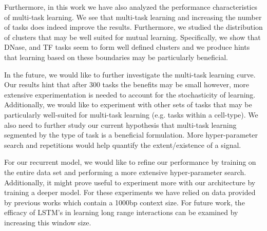 \documentclass{article}
\begin{document}
\par
Furthermore, in this work we have also analyzed the performance characteristics of multi-task learning. We see that multi-task learning and increasing the number of tasks does indeed improve the results.  Furthermore, we studied the distribution of clusters that may be well suited for mutual learning. Specifically, we show that DNase, and TF tasks seem to form well defined clusters and we produce hints that learning based on these boundaries may be particularly beneficial.

In the future, we would like to further investigate the multi-task learning curve. Our results hint that after 300 tasks the benefits may be small however, more extensive experimentation is needed to account for the stochasticity  of learning. Additionally, we would like to experiment with other sets of tasks that may be particularly well-suited for multi-task learning (e.g. tasks within a cell-type). We also need to further study our current hypothesis that multi-task learning segmented by the type of task is a beneficial formulation. More hyper-parameter search and repetitions would help quantify the extent/existence of a signal. 


\par
For our recurrent model, we would like to refine our performance by training on the entire data set and performing a more extensive hyper-parameter search. Additionally, it might prove useful to experiment more with our architecture by training a deeper model. For these experiments we have relied on data provided by previous works which contain a 1000bp context size. For future work, the efficacy of LSTM's in learning long range interactions can be examined by increasing this window size.
\end{document}
